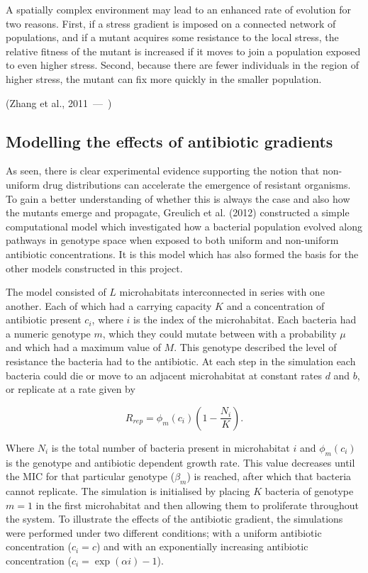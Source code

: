 \documentclass[a4paper,12pt]{article}
\let\oldquote\quote
\let\endoldquote\endquote
\renewenvironment{quote}[2][]
  {\if\relax\detokenize{#1}\relax
     \def\quoteauthor{#2}%
   \else
     \def\quoteauthor{#2~---~#1}%
   \fi
   \oldquote}
  {\par\nobreak\smallskip\hfill(\quoteauthor)%
   \endoldquote\addvspace{\bigskipamount}}
\begin{document}
\begin{quote}{Zhang et al., 2011}
 A spatially complex environment may lead to an enhanced rate of evolution for two reasons.  First, if a stress gradient is imposed on a connected network of 
 populations, and if a mutant acquires some resistance to the local stress, the relative fitness of the mutant is increased if it moves to join a population
 exposed to even higher stress.  Second, because there are fewer individuals in the region of higher stress, the mutant can fix more quickly in the smaller
 population.
\end{quote}

\subsection{Modelling the effects of antibiotic gradients}

As seen, there is clear experimental evidence supporting the notion that non-uniform drug distributions can accelerate the emergence of resistant organisms.  To gain 
a better understanding of whether this is always the case and also how the mutants emerge and propagate,  Greulich et al. (2012) 
\cite{bioref:PRL-drugGradients} constructed a simple computational model which investigated how a bacterial population evolved along pathways 
in genotype space when exposed to both uniform and non-uniform antibiotic concentrations.  It is this model which has also formed the basis for the other models
constructed in this project.

The model consisted of $L$ microhabitats interconnected in series with one another.  Each of which had a carrying capacity $K$ and a concentration of antibiotic present
$c_i$, where $i$ is the index of the microhabitat.  Each bacteria had a numeric genotype $m$, which they could mutate between with a probability $\mu$ 
and which had a maximum value of $M$.  This genotype described the level of resistance the bacteria had to the antibiotic.  At each step in the simulation 
each bacteria could die or move to an adjacent microhabitat at constant rates $d$ and $b$, or replicate at a rate given by 

\begin{equation}
 R_{rep} = \phi_m(c_i)(1 - \frac{N_i}{K}).
 \label{eqn:R_rep}
\end{equation}

Where $N_i$ is the total number of bacteria present in microhabitat $i$ and $\phi_m(c_i)$ is the genotype and antibiotic dependent growth rate.  
This value decreases until the MIC for that particular genotype ($\beta_m$) is reached, after which that bacteria cannot replicate.  The simulation is 
initialised by placing $K$ bacteria of genotype $m=1$ in the first microhabitat and then allowing them to proliferate throughout the system.  To illustrate the effects 
of the antibiotic gradient, the simulations were performed under two different conditions; with a uniform antibiotic concentration ($c_i = c$) and with an exponentially 
increasing antibiotic concentration ($c_i = \exp(\alpha{i}) - 1$).
\end{document}
